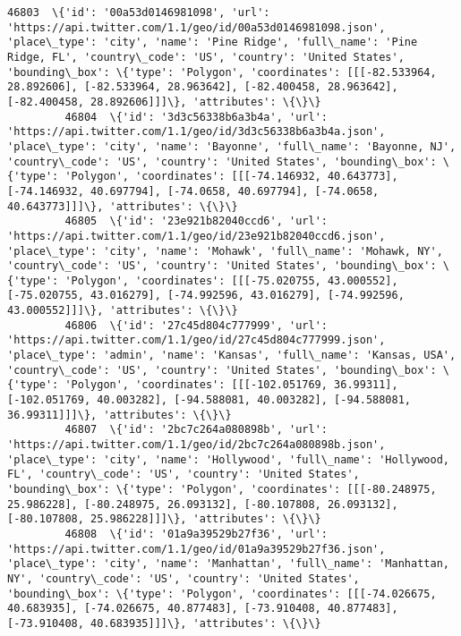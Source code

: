 \documentclass[11pt]{article}
\begin{document}
\begin{Verbatim}[commandchars=\\\{\}]
         46803  \{'id': '00a53d0146981098', 'url': 'https://api.twitter.com/1.1/geo/id/00a53d0146981098.json', 'place\_type': 'city', 'name': 'Pine Ridge', 'full\_name': 'Pine Ridge, FL', 'country\_code': 'US', 'country': 'United States', 'bounding\_box': \{'type': 'Polygon', 'coordinates': [[[-82.533964, 28.892606], [-82.533964, 28.963642], [-82.400458, 28.963642], [-82.400458, 28.892606]]]\}, 'attributes': \{\}\}                   
         46804  \{'id': '3d3c56338b6a3b4a', 'url': 'https://api.twitter.com/1.1/geo/id/3d3c56338b6a3b4a.json', 'place\_type': 'city', 'name': 'Bayonne', 'full\_name': 'Bayonne, NJ', 'country\_code': 'US', 'country': 'United States', 'bounding\_box': \{'type': 'Polygon', 'coordinates': [[[-74.146932, 40.643773], [-74.146932, 40.697794], [-74.0658, 40.697794], [-74.0658, 40.643773]]]\}, 'attributes': \{\}\}                             
         46805  \{'id': '23e921b82040ccd6', 'url': 'https://api.twitter.com/1.1/geo/id/23e921b82040ccd6.json', 'place\_type': 'city', 'name': 'Mohawk', 'full\_name': 'Mohawk, NY', 'country\_code': 'US', 'country': 'United States', 'bounding\_box': \{'type': 'Polygon', 'coordinates': [[[-75.020755, 43.000552], [-75.020755, 43.016279], [-74.992596, 43.016279], [-74.992596, 43.000552]]]\}, 'attributes': \{\}\}                           
         46806  \{'id': '27c45d804c777999', 'url': 'https://api.twitter.com/1.1/geo/id/27c45d804c777999.json', 'place\_type': 'admin', 'name': 'Kansas', 'full\_name': 'Kansas, USA', 'country\_code': 'US', 'country': 'United States', 'bounding\_box': \{'type': 'Polygon', 'coordinates': [[[-102.051769, 36.99311], [-102.051769, 40.003282], [-94.588081, 40.003282], [-94.588081, 36.99311]]]\}, 'attributes': \{\}\}                         
         46807  \{'id': '2bc7c264a080898b', 'url': 'https://api.twitter.com/1.1/geo/id/2bc7c264a080898b.json', 'place\_type': 'city', 'name': 'Hollywood', 'full\_name': 'Hollywood, FL', 'country\_code': 'US', 'country': 'United States', 'bounding\_box': \{'type': 'Polygon', 'coordinates': [[[-80.248975, 25.986228], [-80.248975, 26.093132], [-80.107808, 26.093132], [-80.107808, 25.986228]]]\}, 'attributes': \{\}\}                     
         46808  \{'id': '01a9a39529b27f36', 'url': 'https://api.twitter.com/1.1/geo/id/01a9a39529b27f36.json', 'place\_type': 'city', 'name': 'Manhattan', 'full\_name': 'Manhattan, NY', 'country\_code': 'US', 'country': 'United States', 'bounding\_box': \{'type': 'Polygon', 'coordinates': [[[-74.026675, 40.683935], [-74.026675, 40.877483], [-73.910408, 40.877483], [-73.910408, 40.683935]]]\}, 'attributes': \{\}\}                     

\end{Verbatim}
\end{document}
